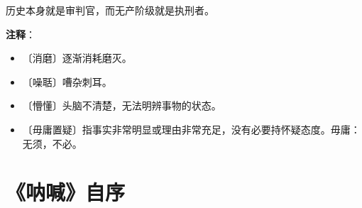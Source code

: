 \documentclass[12pt,UTF-8,openany]{ctexbook}
\begin{document}
\begin{normalsize}
    历史本身就是审判官，而无产阶级就是执刑者。
    
\end{normalsize}


\newpage

\textbf{注释}：

\vspace{-1em}

\begin{itemize}
    \setlength\itemsep{-0.2em}
    \item 〔消磨〕逐渐消耗磨灭。
    \item 〔噪聒〕嘈杂刺耳。
    \item 〔懵懂〕头脑不清楚，无法明辨事物的状态。
    \item 〔毋庸置疑〕指事实非常明显或理由非常充足，没有必要持怀疑态度。毋庸：无须，不必。
\end{itemize}

\chapter{《呐喊》自序}
\end{document}
